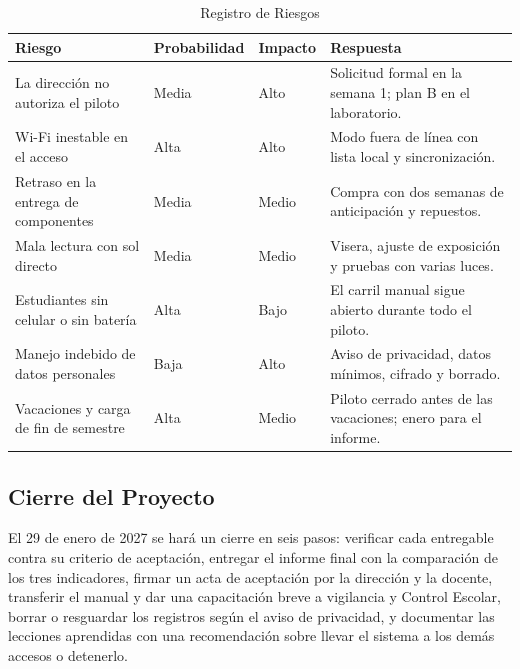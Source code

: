 \begin{table}[tbp]
	\caption{Registro de Riesgos}
	\label{tab:riesgos}
	\small\setlength{\tabcolsep}{3pt}
	\begin{tabular}{P{4.8cm}P{2.3cm}P{1.8cm}P{5.7cm}}
		\toprule
		Riesgo & Probabilidad & Impacto & Respuesta \\
		\midrule
		La dirección no autoriza el piloto & Media & Alto & Solicitud formal en la semana 1; plan B en el laboratorio. \\
		Wi-Fi inestable en el acceso & Alta & Alto & Modo fuera de línea con lista local y sincronización. \\
		Retraso en la entrega de componentes & Media & Medio & Compra con dos semanas de anticipación y repuestos. \\
		Mala lectura con sol directo & Media & Medio & Visera, ajuste de exposición y pruebas con varias luces. \\
		Estudiantes sin celular o sin batería & Alta & Bajo & El carril manual sigue abierto durante todo el piloto. \\
		Manejo indebido de datos personales & Baja & Alto & Aviso de privacidad, datos mínimos, cifrado y borrado. \\
		Vacaciones y carga de fin de semestre & Alta & Medio & Piloto cerrado antes de las vacaciones; enero para el informe. \\
		\bottomrule
	\end{tabular}
\end{table}

\subsection{Cierre del Proyecto}
El 29 de enero de 2027 se hará un cierre en seis pasos: verificar cada
entregable contra su criterio de aceptación, entregar el informe final con la
comparación de los tres indicadores, firmar un acta de aceptación por la
dirección y la docente, transferir el manual y dar una capacitación breve a
vigilancia y Control Escolar, borrar o resguardar los registros según el aviso
de privacidad, y documentar las lecciones aprendidas con una recomendación
sobre llevar el sistema a los demás accesos o detenerlo.
